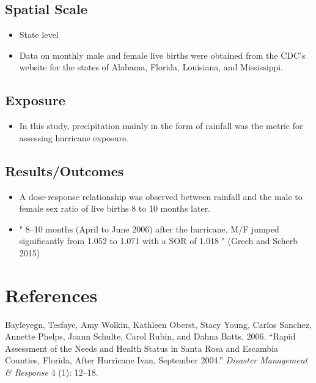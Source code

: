 \documentclass[
]{article}
\providecommand{\tightlist}{%
  \setlength{\itemsep}{0pt}\setlength{\parskip}{0pt}}
\begin{document}
\hypertarget{spatial-scale-30}{%
\subsection{Spatial Scale}\label{spatial-scale-30}}

\begin{itemize}
\tightlist
\item
  State level
\item
  Data on monthly male and female live births were obtained from the
  CDC's website for the states of Alabama, Florida, Louisiana, and
  Mississippi.
\end{itemize}

\hypertarget{exposure-29}{%
\subsection{Exposure}\label{exposure-29}}

\begin{itemize}
\tightlist
\item
  In this study, precipitation mainly in the form of rainfall was the
  metric for assessing hurricane exposure.
\end{itemize}

\hypertarget{resultsoutcomes-19}{%
\subsection{Results/Outcomes}\label{resultsoutcomes-19}}

\begin{itemize}
\tightlist
\item
  A dose-response relationship was observed between rainfall and the
  male to female sex ratio of live births 8 to 10 months later.
\item
  " 8--10 months (April to June 2006) after the hurricane, M/F jumped
  significantly from 1.052 to 1.071 with a SOR of 1.018 " (Grech and
  Scherb 2015)
\end{itemize}

\hypertarget{references}{%
\section*{References}\label{references}}

\hypertarget{refs}{}
\leavevmode\hypertarget{ref-bayleyegn2006rapid}{}%
Bayleyegn, Tesfaye, Amy Wolkin, Kathleen Oberst, Stacy Young, Carlos
Sanchez, Annette Phelps, Joann Schulte, Carol Rubin, and Dahna Batts.
2006. ``Rapid Assessment of the Needs and Health Status in Santa Rosa
and Escambia Counties, Florida, After Hurricane Ivan, September 2004.''
\emph{Disaster Management \& Response} 4 (1): 12--18.
\end{document}

